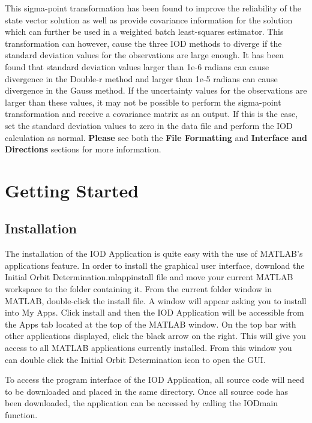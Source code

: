 \documentclass{article}
\begin{document}
		This sigma-point transformation has been found to improve the reliability of the state vector solution as well as provide covariance information 
		for the solution which can further be used in a weighted batch least-squares estimator. This transformation can however, cause the three IOD methods to diverge if the standard deviation values for the observations are
		large enough. It has been found that standard deviation values larger than 1e-6 radians can cause divergence in the Double-r method and larger than 1e-5 radians can cause divergence in the Gauss method. If the uncertainty values for the observations are larger than these values, it may not be possible to perform the 
		sigma-point transformation and receive a covariance matrix as an output. If this is the case, set the standard deviation values to zero in the data file and perform the IOD calculation as normal. \textbf{Please} see both the \textbf{File Formatting} and \textbf{Interface and Directions} sections
		for more information. \par

		
		
	\newpage
	\section{Getting Started}
		\subsection{Installation}
			\hspace{0.45 cm} The installation of the IOD Application is quite easy with the use of MATLAB's applications feature. In order to install the graphical user interface, download the Initial Orbit Determination.mlappinstall file and move
			your current MATLAB workspace to the folder containing it. From the current folder window in MATLAB, double-click the install file. A window will appear asking you to install into My Apps. Click install and 
			then the IOD Application will be accessible from the Apps tab located at the top of the MATLAB window. On the top bar with other applications displayed, click the black arrow on the right. This will give you
			access to all MATLAB applications currently installed. From this window you can double click the Initial Orbit Determination icon to open the GUI. \par

			To access the program interface of the IOD Application, all source code will need to be downloaded and placed in the same directory. Once all source code has been downloaded, the application can be accessed by calling the IODmain function.\newline\newline
\end{document}
